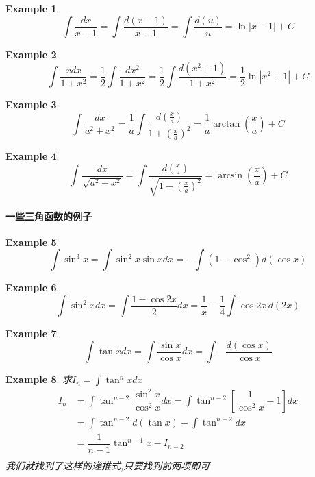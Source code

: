 \documentclass[11pt,hyperref,a4paper,UTF8]{ctexart}
\newtheorem{example}{Example}[subsection]
\begin{document}
\begin{CJK}{UTF8}{gkai}
\begin{example}
  \[\int \dfrac{dx}{x-1} = \int \dfrac{d(x-1)}{x-1}=\int \dfrac{d(u)}{u}=\ln|x-1| + C \]
\end{example}

\begin{example}
  \[\int \dfrac{xdx}{1+x^2} = \dfrac{1}{2}\int \dfrac{dx^2}{1+x^2}=\dfrac{1}{2}\int \dfrac{d(x^2+1)}{1+x^2}= \dfrac{1}{2}\ln|x^2 + 1 | + C\]
\end{example}

\begin{example}
  \[\int \dfrac{dx}{a^2 + x^2} =\dfrac{1}{a}\int \dfrac{d(\frac{x}{a})}{1 + (\frac{x}{a})^2} = \dfrac{1}{a} \arctan (\dfrac{x}{a}) + C\]
\end{example}

\begin{example}
  \[\int \dfrac{dx}{\sqrt{a^2 - x^2}} = \int \dfrac{d(\frac{x}{a})}{\sqrt{1-(\frac{x}{a})^2}} = \arcsin (\dfrac{x}{a}) + C\]
\end{example}

\paragraph{一些三角函数的例子}
\begin{example}
  \[\int \sin^3 x = \int \sin^2 x \sin x dx = -\int(1- \cos^2) d(\cos x)\]
\end{example}

\begin{example}
  \[\int \sin^2 x dx = \int \dfrac{1-\cos 2x}{2} dx = \dfrac{1}{x} - \dfrac{1}{4}\int \cos 2x\, d(2x)\]
\end{example}
\begin{example}
  \[\int \tan x dx = \int \dfrac{\sin x}{\cos x} dx = \int -\dfrac{d(\cos x )}{\cos x}\]
\end{example}

\begin{example}
  求$I_n = \int \tan^n x dx$\\
  \[
  \begin{aligned}  
  I_n &= \int \tan^{n-2} \dfrac{\sin^2 x}{\cos^2 x}dx = \int \tan^{n-2} [\dfrac{1}{\cos^2 x} - 1]dx \\
  &= \int \tan^{n-2} d(\tan x) - \int \tan^{n-2}dx\\ 
  &= \dfrac{1}{n-1} \tan^{n-1} x - I_{n-2}\\
  \end{aligned}
  \]
  我们就找到了这样的递推式,只要找到前两项即可\\
\end{example}


\end{CJK}
\end{document}
